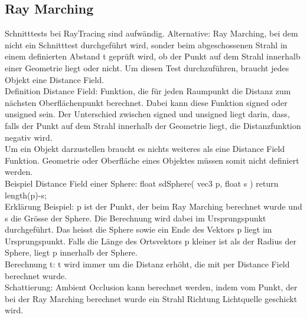 \documentclass[10pt]{article}
\begin{document}
\subsection{Ray Marching}
Schnitttests bei RayTracing sind aufwändig. Alternative: Ray Marching, bei dem nicht ein Schnitttest durchgeführt wird, sonder beim abgeschossenen Strahl in einem definierten Abstand t geprüft wird, ob der Punkt auf dem Strahl innerhalb einer Geometrie liegt oder nicht. Um diesen Test durchzuführen, braucht jedes Objekt eine Distance Field.\\
Definition Distance Field: Funktion, die für jeden Raumpunkt die Distanz zum nächsten Oberflächenpunkt berechnet. Dabei kann diese Funktion signed oder unsigned sein. Der Unterschied zwischen signed und unsigned liegt darin, dass, falls der Punkt auf dem Strahl innerhalb der Geometrie liegt, die Distanzfunktion negativ wird.\\
Um ein Objekt darzustellen braucht es nichts weiteres als eine Distance Field Funktion. Geometrie oder Oberfläche eines Objektes müssen somit nicht definiert werden.\\
Beispiel Distance Field einer Sphere: float sdSphere( vec3 p, float s ) { return length(p)-s; }\\
Erklärung Beispiel: p ist der Punkt, der beim Ray Marching berechnet wurde und s die Grösse der Sphere. Die Berechnung wird dabei im Ursprungspunkt durchgeführt. Das heisst die Sphere sowie ein Ende des Vektors p liegt im Ursprungspunkt. Falls die Länge des Ortsvektors p kleiner ist als der Radius der Sphere, liegt p innerhalb der Sphere.\\
Berechnung t: t wird immer um die Distanz erhöht, die mit per Distance Field berechnet wurde.\\
Schattierung: Ambient Occlusion kann berechnet werden, indem vom Punkt, der bei der Ray Marching berechnet wurde ein Strahl Richtung Lichtquelle geschickt wird.


\end{document}
